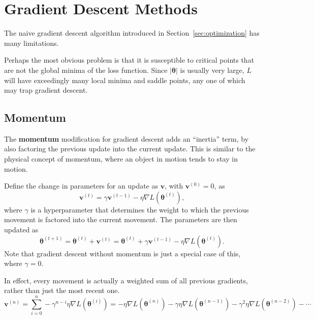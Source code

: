 \documentclass[12pt]{report}
\theoremstyle{definition}
\theoremstyle{remark}
\begin{document}
\section{Gradient Descent Methods}\label{sec:gradient-descent-methods}

The naive gradient descent algorithm introduced in Section~\ref{sec:optimization} has many limitations.

Perhaps the most obvious problem is that it is susceptible to critical points that are not the global minima of the loss function. Since $|\boldsymbol{\theta}|$ is usually very large, $L$ will have exceedingly many local minima and saddle points, any one of which may trap gradient descent.

\subsection{Momentum}
The \textbf{momentum} modification for gradient descent adds an ``inertia'' term, by also factoring the previous update into the current update. This is similar to the physical concept of momentum, where an object in motion tends to stay in motion.

Define the change in parameters for an update as $\mathbf{v}$, with $\mathbf{v}^{(0)} = 0$, as
\begin{equation}
    \mathbf{v}^{(t)} = \gamma \mathbf{v}^{(t-1)} - \eta \nabla L(\boldsymbol{\theta}^{(t)}),
\end{equation}
where $\gamma$ is a hyperparameter that determines the weight to which the previous movement is factored into the current movement. The parameters are then updated as
\begin{equation}
    \boldsymbol{\theta}^{(t+1)} = \boldsymbol{\theta}^{(t)} + \mathbf{v}^{(t)} = \boldsymbol{\theta}^{(t)} + \gamma \mathbf{v}^{(t-1)} - \eta \nabla L(\boldsymbol{\theta}^{(t)}).
\end{equation}
Note that gradient descent without momentum is just a special case of this, where $\gamma = 0$.

In effect, every movement is actually a weighted sum of all previous gradients, rather than just the most recent one.
\begin{equation}
    \mathbf{v}^{(n)} = \sum_{i=0}^{n} -\gamma^{n-i} \eta\nabla L(\boldsymbol{\theta}^{(i)}) = -\eta\nabla L(\boldsymbol{\theta}^{(n)}) - \gamma \eta\nabla L(\boldsymbol{\theta}^{(n-1)}) - \gamma^2 \eta\nabla L(\boldsymbol{\theta}^{(n-2)}) - \cdots
\end{equation}
\end{document}
